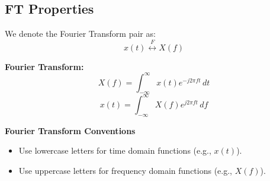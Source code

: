 \subsection{FT Properties}
\begin{definition}
    We denote the Fourier Transform pair as:
    \[
    x(t) \overset{F}{\leftrightarrow} X(f)
    \]
    \vspace{1em}

    \textbf{Fourier Transform:}
    \[
    X(f) = \int_{-\infty}^{\infty} x(t) e^{-j 2 \pi f t} \, dt
    \]
    \[
    x(t) = \int_{-\infty}^{\infty} X(f) e^{j 2 \pi f t} \, df
    \]
    \vspace{1em}

    \textbf{Fourier Transform Conventions}
    \begin{itemize}
        \item Use lowercase letters for time domain functions (e.g., \( x(t) \)).
        \item Use uppercase letters for frequency domain functions (e.g., \( X(f) \)).
    \end{itemize}
\end{definition}

